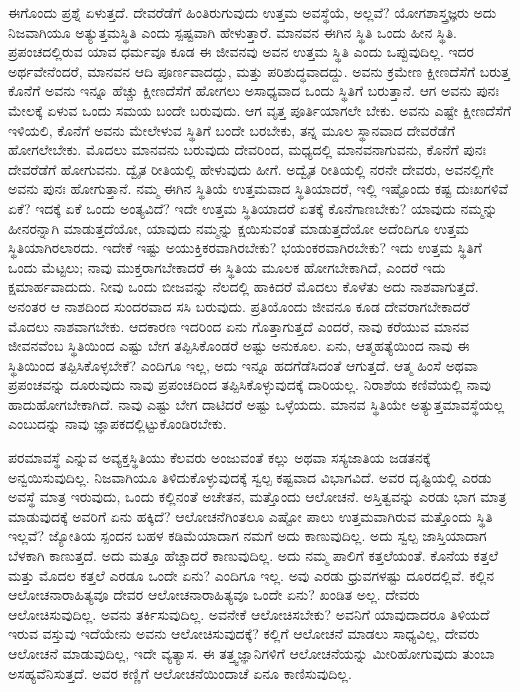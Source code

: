 ಈಗೊಂದು ಪ್ರಶ್ನೆ ಏಳುತ್ತದೆ. ದೇವರೆಡೆಗೆ ಹಿಂತಿರುಗುವುದು ಉತ್ತಮ ಅವಸ್ಥೆಯೆ, ಅಲ್ಲವೆ? ಯೋಗಶಾಸ್ತ್ರಜ್ಞರು ಅದು ನಿಜವಾಗಿಯೂ ಅತ್ಯುತ್ತಮಸ್ಥಿತಿ ಎಂದು ಸ್ಪಷ್ಟವಾಗಿ ಹೇಳುತ್ತಾರೆ. ಮಾನವನ ಈಗಿನ ಸ್ಥಿತಿ ಒಂದು ಹೀನ ಸ್ಥಿತಿ. ಪ್ರಪಂಚದಲ್ಲಿರುವ ಯಾವ ಧರ್ಮವೂ ಕೂಡ ಈ ಜೀವನವು ಅವನ ಉತ್ತಮ ಸ್ಥಿತಿ ಎಂದು ಒಪ್ಪುವುದಿಲ್ಲ. ಇದರ ಅರ್ಥವೇನೆಂದರೆ, ಮಾನವನ ಆದಿ ಪೂರ್ಣವಾದದ್ದು, ಮತ್ತು ಪರಿಶುದ್ಧವಾದದ್ದು. ಅವನು ಕ್ರಮೇಣ ಕ್ಷೀಣದೆಸೆಗೆ ಬರುತ್ತ ಕೊನೆಗೆ ಅವನು ಇನ್ನೂ ಹೆಚ್ಚು ಕ್ಷೀಣದೆಸೆಗೆ ಹೋಗಲು ಅಸಾಧ್ಯವಾದ ಒಂದು ಸ್ಥಿತಿಗೆ ಬರುತ್ತಾನೆ. ಆಗ ಅವನು ಪುನಃ ಮೇಲಕ್ಕೆ ಏಳುವ ಒಂದು ಸಮಯ ಬಂದೇ ಬರುವುದು. ಆಗ ವೃತ್ತ ಪೂರ್ತಿಯಾಗಲೇ ಬೇಕು. ಅವನು ಎಷ್ಟೇ ಕ್ಷೀಣದೆಸೆಗೆ ಇಳಿಯಲಿ, ಕೊನೆಗೆ ಅವನು ಮೇಲೇಳುವ ಸ್ಥಿತಿಗೆ ಬಂದೇ ಬರಬೇಕು, ತನ್ನ ಮೂಲ ಸ್ಥಾನವಾದ ದೇವರೆಡೆಗೆ ಹೋಗಲೇಬೇಕು. ಮೊದಲು ಮಾನವನು ಬರುವುದು ದೇವರಿಂದ, ಮಧ್ಯದಲ್ಲಿ ಮಾನವನಾಗುವನು, ಕೊನೆಗೆ ಪುನಃ ದೇವರೆಡೆಗೆ ಹೋಗುವನು. ದ್ವೈತ ರೀತಿಯಲ್ಲಿ ಹೇಳುವುದು ಹೀಗೆ. ಅದ್ವೈತ ರೀತಿಯಲ್ಲಿ ನರನೇ ದೇವರು, ಅವನಲ್ಲಿಗೇ ಅವನು ಪುನಃ ಹೋಗುತ್ತಾನೆ. ನಮ್ಮ ಈಗಿನ ಸ್ಥಿತಿಯೆ ಉತ್ತಮವಾದ ಸ್ಥಿತಿಯಾದರೆ, ಇಲ್ಲಿ ಇಷ್ಟೊಂದು ಕಷ್ಟ ದುಃಖಗಳಿವೆ ಏಕೆ? ಇದಕ್ಕೆ ಏಕೆ ಒಂದು ಅಂತ್ಯವಿದೆ? ಇದೇ ಉತ್ತಮ ಸ್ಥಿತಿಯಾದರೆ ಏತಕ್ಕೆ ಕೊನೆಗಾಣಬೇಕು? ಯಾವುದು ನಮ್ಮನ್ನು ಹೀನರನ್ನಾಗಿ ಮಾಡುತ್ತದೆಯೋ, ಯಾವುದು ನಮ್ಮನ್ನು ಕ್ಷಯಿಸುವಂತೆ ಮಾಡುತ್ತದೆಯೋ ಅದೆಂದಿಗೂ ಉತ್ತಮ ಸ್ಥಿತಿಯಾಗಿರಲಾರದು. ಇದೇಕೆ ಇಷ್ಟು ಅಯುಕ್ತಿಕರವಾಗಿರಬೇಕು? ಭಯಂಕರವಾಗಿರಬೇಕು? ಇದು ಉತ್ತಮ ಸ್ಥಿತಿಗೆ ಒಂದು ಮೆಟ್ಟಲು; ನಾವು ಮುಕ್ತರಾಗಬೇಕಾದರೆ ಈ ಸ್ಥಿತಿಯ ಮೂಲಕ ಹೋಗಬೇಕಾಗಿದೆ, ಎಂದರೆ ಇದು ಕ್ಷಮಾರ್ಹವಾದುದು. ನೀವು ಒಂದು ಬೀಜವನ್ನು ನೆಲದಲ್ಲಿ ಹಾಕಿದರೆ ಮೊದಲು ಕೊಳೆತು ಅದು ನಾಶವಾಗುತ್ತದೆ. ಅನಂತರ ಆ ನಾಶದಿಂದ ಸುಂದರವಾದ ಸಸಿ ಬರುವುದು. ಪ್ರತಿಯೊಂದು ಜೀವನೂ ಕೂಡ ದೇವರಾಗಬೇಕಾದರೆ ಮೊದಲು ನಾಶವಾಗಬೇಕು. ಆದಕಾರಣ ಇದರಿಂದ ಏನು ಗೊತ್ತಾಗುತ್ತದೆ ಎಂದರೆ, ನಾವು ಕರೆಯುವ ಮಾನವ ಜೀವನವೆಂಬ ಸ್ಥಿತಿಯಿಂದ ಎಷ್ಟು ಬೇಗ ತಪ್ಪಿಸಿಕೊಂಡರೆ ಅಷ್ಟು ಅನುಕೂಲ. ಏನು, ಆತ್ಮಹತ್ಯೆಯಿಂದ ನಾವು ಈ ಸ್ಥಿತಿಯಿಂದ ತಪ್ಪಿಸಿಕೊಳ್ಳಬೇಕೆ? ಎಂದಿಗೂ ಇಲ್ಲ, ಅದು ಇನ್ನೂ ಹದಗೆಡೆಸಿದಂತೆ ಆಗುತ್ತದೆ. ಆತ್ಮ ಹಿಂಸೆ ಅಥವಾ ಪ್ರಪಂಚವನ್ನು ದೂರುವುದು ನಾವು ಪ್ರಪಂಚದಿಂದ ತಪ್ಪಿಸಿಕೊಳ್ಳುವುದಕ್ಕೆ ದಾರಿಯಲ್ಲ. ನಿರಾಶೆಯ ಕಣಿವೆಯಲ್ಲಿ ನಾವು ಹಾದುಹೋಗಬೇಕಾಗಿದೆ. ನಾವು ಎಷ್ಟು ಬೇಗ ದಾಟಿದರೆ ಅಷ್ಟು ಒಳ್ಳೆಯದು. ಮಾನವ ಸ್ಥಿತಿಯೇ ಅತ್ಯುತ್ತಮಾವಸ್ಥೆಯಲ್ಲ ಎಂಬುದನ್ನು ನಾವು ಜ್ಞಾಪಕದಲ್ಲಿಟ್ಟುಕೊಂಡಿರಬೇಕು. 

\vskip 0.3cm

ಪರಮಾವಸ್ಥೆ ಎನ್ನುವ ಅವ್ಯಕ್ತಸ್ಥಿತಿಯು ಕೆಲವರು ಅಂಜುವಂತೆ ಕಲ್ಲು ಅಥವಾ ಸಸ್ಯಜಾತಿಯ ಜಡತನಕ್ಕೆ ಅನ್ವಯಿಸುವುದಿಲ್ಲ. ನಿಜವಾಗಿಯೂ ತಿಳಿದುಕೊಳ್ಳುವುದಕ್ಕೆ ಸ್ವಲ್ಪ ಕಷ್ಟವಾದ ವಿಭಾಗವಿದೆ. ಅವರ ದೃಷ್ಟಿಯಲ್ಲಿ ಎರಡು ಅವಸ್ಥೆ ಮಾತ್ರ ಇರುವುದು, ಒಂದು ಕಲ್ಲಿನಂತೆ ಅಚೇತನ, ಮತ್ತೊಂದು ಆಲೋಚನೆ. ಅಸ್ತಿತ್ವವನ್ನು ಎರಡು ಭಾಗ ಮಾತ್ರ ಮಾಡುವುದಕ್ಕೆ ಅವರಿಗೆ ಏನು ಹಕ್ಕಿದೆ? ಆಲೋಚನೆಗಿಂತಲೂ ಎಷ್ಟೋ ಪಾಲು ಉತ್ತಮವಾಗಿರುವ ಮತ್ತೊಂದು ಸ್ಥಿತಿ ಇಲ್ಲವೆ? ಜ್ಯೋತಿಯ ಸ್ಪಂದನ ಬಹಳ ಕಡಿಮೆಯಾದಾಗ ನಮಗೆ ಅದು ಕಾಣುವುದಿಲ್ಲ. ಅದು ಸ್ವಲ್ಪ ಜಾಸ್ತಿಯಾದಾಗ ಬೆಳಕಾಗಿ ಕಾಣುತ್ತದೆ. ಅದು ಮತ್ತೂ ಹೆಚ್ಚಾದರೆ ಕಾಣುವುದಿಲ್ಲ. ಅದು ನಮ್ಮ ಪಾಲಿಗೆ ಕತ್ತಲೆಯಂತೆ. ಕೊನೆಯ ಕತ್ತಲೆ ಮತ್ತು ಮೊದಲ ಕತ್ತಲೆ ಎರಡೂ ಒಂದೇ ಏನು? ಎಂದಿಗೂ ಇಲ್ಲ. ಅವು ಎರಡು ಧ್ರುವಗಳಷ್ಟು ದೂರದಲ್ಲಿವೆ. ಕಲ್ಲಿನ ಆಲೋಚನಾರಾಹಿತ್ಯವೂ ದೇವರ ಆಲೋಚನಾರಾಹಿತ್ಯವೂ ಒಂದೇ ಏನು? ಖಂಡಿತ ಅಲ್ಲ. ದೇವರು ಆಲೋಚಿಸುವುದಿಲ್ಲ. ಅವನು ತರ್ಕಿಸುವುದಿಲ್ಲ. ಅವನೇಕೆ ಆಲೋಚಿಸಬೇಕು? ಅವನಿಗೆ ಯಾವುದಾದರೂ ತಿಳಿಯದೆ ಇರುವ ವಸ್ತುವು ಇದೆಯೇನು ಅವನು ಆಲೋಚಿಸುವುದಕ್ಕೆ? ಕಲ್ಲಿಗೆ ಆಲೋಚನೆ ಮಾಡಲು ಸಾಧ್ಯವಿಲ್ಲ, ದೇವರು ಆಲೋಚನೆ ಮಾಡುವುದಿಲ್ಲ, ಇದೇ ವ್ಯತ್ಯಾಸ. ಈ ತತ್ತ್ವಜ್ಞಾನಿಗಳಿಗೆ ಆಲೋಚನೆಯನ್ನು ಮೀರಿಹೋಗುವುದು ತುಂಬಾ ಅಸಹ್ಯವೆನಿಸುತ್ತದೆ. ಅವರ ಕಣ್ಣಿಗೆ ಆಲೋಚನೆಯಿಂದಾಚೆ ಏನೂ ಕಾಣಿಸುವುದಿಲ್ಲ. 

